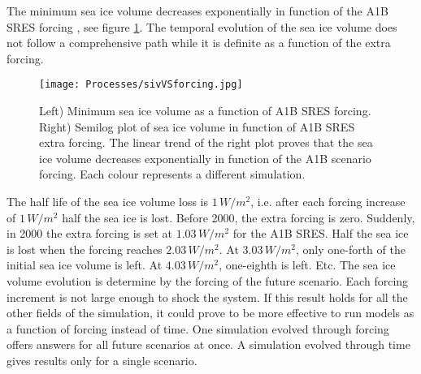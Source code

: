 The minimum sea ice volume decreases exponentially in function of the  A1B SRES forcing , see figure \ref{sivVSF}. The temporal evolution of the sea ice volume does not follow a comprehensive path while it is definite as a function of the extra forcing.
\begin{figure}[t!]
\center
\noindent\texttt{[image: Processes/sivVSforcing.jpg]}
\caption{Left) Minimum sea ice volume as a function of A1B SRES forcing. Right) Semilog plot of sea ice volume in function of A1B SRES extra forcing. The linear trend of the right plot proves that the sea ice volume decreases exponentially in function of the A1B scenario forcing. Each colour represents a different simulation.}
\label{sivVSF}
\end{figure}
The half life of the sea ice volume loss is $1\,W/m^2$, i.e. after each forcing increase of $1\,W/m^2$ half the sea ice is lost. Before 2000, the extra forcing is zero. Suddenly, in 2000 the extra forcing is set at $1.03\,W/m^2$ for the A1B SRES. Half the sea ice is lost when the forcing reaches $2.03\,W/m^2$. At $3.03\,W/m^2$, only one-forth of the initial sea ice volume is left. At $4.03\,W/m^2$, one-eighth is left. Etc. The sea ice volume evolution is determine by the forcing of the future scenario. Each forcing increment is not large enough to shock the system. If this result holds for all the other fields of the simulation, it could prove to be more effective to run models as a function of forcing instead of time. One simulation evolved through forcing offers answers for all future scenarios at once. A simulation evolved through time gives results only for a single scenario. 

